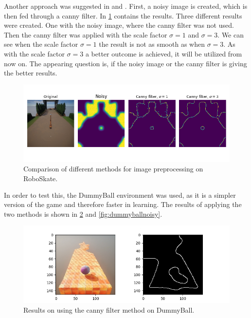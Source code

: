 \documentclass[conference]{IEEEtran}
\begin{document}
Another approach was suggested in \cite{ImageProcessing} and \cite{Canny}. First, a noisy image is created, which is then fed through a canny filter. In \figurename  \ref{fig:preprocessingcomparision} contains the results. Three different results were created. One with the noisy image, where the canny filter was not used. Then the canny filter was applied with the scale factor $\sigma = 1$ and $\sigma = 3$. We can see when the scale factor $\sigma = 1$ the result is not as smooth as when $\sigma = 3$. As with the scale factor $\sigma = 3$ a better outcome is achieved, it will be utilized from now on. The appearing question is, if the noisy image or the canny filter is giving the better results. 

\begin{figure}[!t]
\centering
\includegraphics[width = 1.0\linewidth]{images/Preprocessing_Comparision.png}
\caption{Comparison of different methods for image preprocessing on RoboSkate.}
\label{fig:preprocessingcomparision}
\end{figure}

In order to test this, the DummyBall environment was used, as it is a simpler version of the game and therefore faster in learning. The results of applying the two methods is shown in \figurename  \ref{fig:dummyballcanny} and \ref{fig:dummyballnoisy}.

\begin{figure}[!t]
\centering
\includegraphics[width = 1.0\linewidth]{images/DummyBall_Canny.png}
\caption{Results on using the canny filter method on DummyBall.}
\label{fig:dummyballcanny}
\end{figure}
\end{document}
